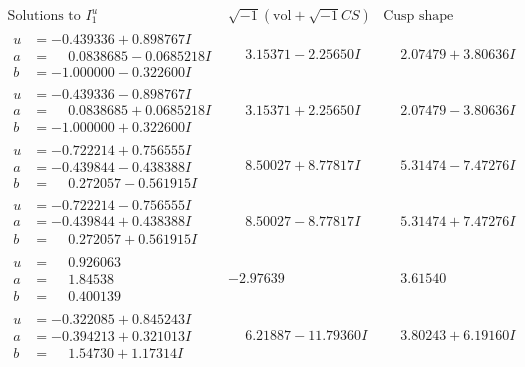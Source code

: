 \documentclass[1p]{elsarticle_modified}
\theoremstyle{definition}
\newcommand{\I}{\sqrt{-1}}
\begin{document}
$$\begin{array}{c|c|c}  
\text{Solutions to }I^u_{1}& \I (\text{vol} + \sqrt{-1}CS) & \text{Cusp shape}\\
 \hline 
\begin{aligned}
u &= -0.439336 + 0.898767 I \\
a &= \phantom{-}0.0838685 - 0.0685218 I \\
b &= -1.000000 - 0.322600 I\end{aligned}
 & \phantom{-}3.15371 - 2.25650 I & \phantom{-}2.07479 + 3.80636 I \\ \hline\begin{aligned}
u &= -0.439336 - 0.898767 I \\
a &= \phantom{-}0.0838685 + 0.0685218 I \\
b &= -1.000000 + 0.322600 I\end{aligned}
 & \phantom{-}3.15371 + 2.25650 I & \phantom{-}2.07479 - 3.80636 I \\ \hline\begin{aligned}
u &= -0.722214 + 0.756555 I \\
a &= -0.439844 - 0.438388 I \\
b &= \phantom{-}0.272057 - 0.561915 I\end{aligned}
 & \phantom{-}8.50027 + 8.77817 I & \phantom{-}5.31474 - 7.47276 I \\ \hline\begin{aligned}
u &= -0.722214 - 0.756555 I \\
a &= -0.439844 + 0.438388 I \\
b &= \phantom{-}0.272057 + 0.561915 I\end{aligned}
 & \phantom{-}8.50027 - 8.77817 I & \phantom{-}5.31474 + 7.47276 I \\ \hline\begin{aligned}
u &= \phantom{-}0.926063\phantom{ +0.000000I} \\
a &= \phantom{-}1.84538\phantom{ +0.000000I} \\
b &= \phantom{-}0.400139\phantom{ +0.000000I}\end{aligned}
 & -2.97639\phantom{ +0.000000I} & \phantom{-}3.61540\phantom{ +0.000000I} \\ \hline\begin{aligned}
u &= -0.322085 + 0.845243 I \\
a &= -0.394213 + 0.321013 I \\
b &= \phantom{-}1.54730 + 1.17314 I\end{aligned}
 & \phantom{-}6.21887 - 11.79360 I & \phantom{-}3.80243 + 6.19160 I \\ \hline\begin{aligned}

\end{aligned}
\end{array}$$
\end{document}

